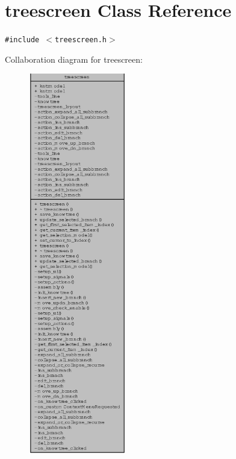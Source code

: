 \section{treescreen Class Reference}
\label{classtreescreen}
{\tt \#include $<$treescreen.h$>$}

Collaboration diagram for treescreen:\begin{figure}[H]
\begin{center}
\leavevmode
\includegraphics[width=121pt]{classtreescreen__coll__graph}
\end{center}
\end{figure}
